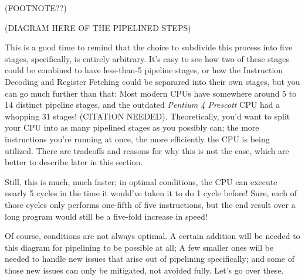 \documentclass[12pt,twoside]{reedthesis}
\begin{document}
(FOOTNOTE??)

(DIAGRAM HERE OF THE PIPELINED STEPS)

This is a good time to remind that the choice to subdivide this process into five stages, specifically, is entirely arbitrary. It's easy to see how two of these stages could be combined to have less-than-5 pipeline stages, or how the Instruction Decoding and Register Fetching could be separared into their own stages, but you can go much further than that: Most modern CPUs have somewhere around 5 to 14 distinct pipeline stages, and the outdated \textit{Pentium 4 Prescott} CPU had a whopping 31 stages! (CITATION NEEDED). Theoretically, you'd want to split your CPU into as many pipelined stages as you possibly can; the more instructions you're running at once, the more efficiently the CPU is being utilized. There are tradeoffs and reasons for why this is not the case, which are better to describe later in this section.

Still, this is much, much faster;  in optimal conditions, the CPU can execute nearly 5 cycles in the time it would've taken it to do 1 cycle before! Sure, each of those cycles only performs one-fifth of five instructions, but the end result over a long program would still be a five-fold increase in speed!

Of course, conditions are not always optimal. A certain addition will be needed to this diagram for pipelining to be possible at all; A few smaller ones will be needed to handle new issues that arise out of pipelining specifically; and some of those new issues can only be mitigated, not avoided fully. Let's go over these.
\end{document}

